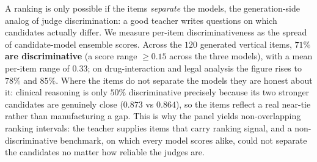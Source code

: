 \documentclass[11pt,a4paper]{article}
\begin{document}
A ranking is only possible if the items \emph{separate} the models, the generation-side analog of judge
discrimination: a good teacher writes questions on which candidates actually differ. We measure per-item
discriminativeness as the spread of candidate-model ensemble scores. Across the \(120\) generated vertical items,
\textbf{\(71\%\) are discriminative} (a score range \(\ge 0.15\) across the three models), with a mean per-item
range of \(0.33\); on drug-interaction and legal analysis the figure rises to \(78\%\) and \(85\%\). Where the items do not
separate the models they are honest about it: clinical reasoning is only \(50\%\) discriminative precisely because its
two stronger candidates are genuinely close (\(0.873\) vs \(0.864\)), so the items reflect a real near-tie rather than
manufacturing a gap. This is why the panel yields non-overlapping ranking intervals: the teacher supplies items that
carry ranking signal, and a non-discriminative benchmark, on which every model scores alike, could not separate the
candidates no matter how reliable the judges are.
\end{document}
